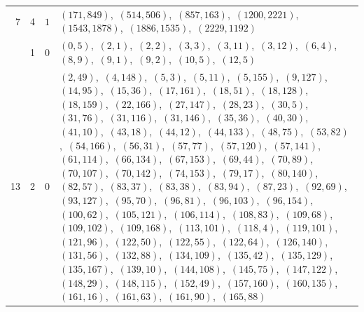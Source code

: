 \documentclass[11pt]{article}
\begin{document}
\begin{longtable}{@{}rrl>{\raggedright\arraybackslash}p{}@{}}
7 & 4 & $1$ & $(171,849)$,\allowbreak\ $(514,506)$,\allowbreak\ $(857,163)$,\allowbreak\ $(1200,2221)$,\allowbreak\ $(1543,1878)$,\allowbreak\ $(1886,1535)$,\allowbreak\ $(2229,1192)$\\
\addlinespace[3pt]
13 & 1 & $0$ & $(0,5)$,\allowbreak\ $(2,1)$,\allowbreak\ $(2,2)$,\allowbreak\ $(3,3)$,\allowbreak\ $(3,11)$,\allowbreak\ $(3,12)$,\allowbreak\ $(6,4)$,\allowbreak\ $(8,9)$,\allowbreak\ $(9,1)$,\allowbreak\ $(9,2)$,\allowbreak\ $(10,5)$,\allowbreak\ $(12,5)$\\
13 & 2 & $0$ & $(2,49)$,\allowbreak\ $(4,148)$,\allowbreak\ $(5,3)$,\allowbreak\ $(5,11)$,\allowbreak\ $(5,155)$,\allowbreak\ $(9,127)$,\allowbreak\ $(14,95)$,\allowbreak\ $(15,36)$,\allowbreak\ $(17,161)$,\allowbreak\ $(18,51)$,\allowbreak\ $(18,128)$,\allowbreak\ $(18,159)$,\allowbreak\ $(22,166)$,\allowbreak\ $(27,147)$,\allowbreak\ $(28,23)$,\allowbreak\ $(30,5)$,\allowbreak\ $(31,76)$,\allowbreak\ $(31,116)$,\allowbreak\ $(31,146)$,\allowbreak\ $(35,36)$,\allowbreak\ $(40,30)$,\allowbreak\ $(41,10)$,\allowbreak\ $(43,18)$,\allowbreak\ $(44,12)$,\allowbreak\ $(44,133)$,\allowbreak\ $(48,75)$,\allowbreak\ $(53,82)$,\allowbreak\ $(54,166)$,\allowbreak\ $(56,31)$,\allowbreak\ $(57,77)$,\allowbreak\ $(57,120)$,\allowbreak\ $(57,141)$,\allowbreak\ $(61,114)$,\allowbreak\ $(66,134)$,\allowbreak\ $(67,153)$,\allowbreak\ $(69,44)$,\allowbreak\ $(70,89)$,\allowbreak\ $(70,107)$,\allowbreak\ $(70,142)$,\allowbreak\ $(74,153)$,\allowbreak\ $(79,17)$,\allowbreak\ $(80,140)$,\allowbreak\ $(82,57)$,\allowbreak\ $(83,37)$,\allowbreak\ $(83,38)$,\allowbreak\ $(83,94)$,\allowbreak\ $(87,23)$,\allowbreak\ $(92,69)$,\allowbreak\ $(93,127)$,\allowbreak\ $(95,70)$,\allowbreak\ $(96,81)$,\allowbreak\ $(96,103)$,\allowbreak\ $(96,154)$,\allowbreak\ $(100,62)$,\allowbreak\ $(105,121)$,\allowbreak\ $(106,114)$,\allowbreak\ $(108,83)$,\allowbreak\ $(109,68)$,\allowbreak\ $(109,102)$,\allowbreak\ $(109,168)$,\allowbreak\ $(113,101)$,\allowbreak\ $(118,4)$,\allowbreak\ $(119,101)$,\allowbreak\ $(121,96)$,\allowbreak\ $(122,50)$,\allowbreak\ $(122,55)$,\allowbreak\ $(122,64)$,\allowbreak\ $(126,140)$,\allowbreak\ $(131,56)$,\allowbreak\ $(132,88)$,\allowbreak\ $(134,109)$,\allowbreak\ $(135,42)$,\allowbreak\ $(135,129)$,\allowbreak\ $(135,167)$,\allowbreak\ $(139,10)$,\allowbreak\ $(144,108)$,\allowbreak\ $(145,75)$,\allowbreak\ $(147,122)$,\allowbreak\ $(148,29)$,\allowbreak\ $(148,115)$,\allowbreak\ $(152,49)$,\allowbreak\ $(157,160)$,\allowbreak\ $(160,135)$,\allowbreak\ $(161,16)$,\allowbreak\ $(161,63)$,\allowbreak\ $(161,90)$,\allowbreak\ $(165,88)$\\

\end{longtable}
\end{document}
